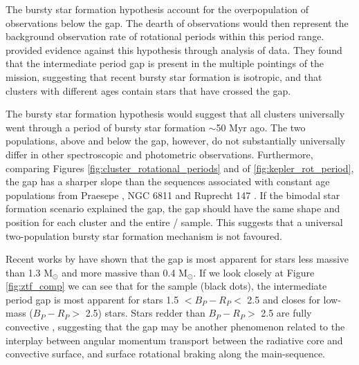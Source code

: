 The bursty star formation hypothesis  account for the overpopulation of observations below the gap. 
The dearth of observations would then represent the background observation rate of rotational periods within this period range.
\citet{gordon_stellar_2021} provided evidence against this hypothesis through analysis of \ktoo{} data.
They found that the intermediate period gap is present in the multiple pointings of the \ktoo{} mission, suggesting that recent bursty star formation is isotropic, and that clusters with different ages contain stars that have crossed the gap.

The bursty star formation hypothesis would suggest that all clusters universally went through a period of bursty star formation $\sim$50 Myr ago. 
The two populations, above and below the gap, however, do not substantially universally differ in other spectroscopic and photometric observations.
Furthermore, comparing Figures \ref{fig:cluster_rotational_periods} and of \ref{fig:kepler_rot_period}, the gap has a sharper slope than the sequences associated with constant age populations from Praesepe \citep{douglas_poking_2017,douglas_k2_2019}, NGC 6811 \citep{curtis_temporary_2019} and Ruprecht 147 \citep{curtis_when_2020}. 
If the bimodal star formation scenario explained the gap, the gap should have the same shape and position for each cluster and the entire \ktoo/\kepler{} sample.
This suggests that a universal two-population bursty star formation mechanism is not favoured.

Recent works by \citet{lu_bridging_2022} have shown that the gap is most apparent for stars less massive than 1.3 M$_{\odot}$ and more massive than 0.4 M$_{\odot}$.
If we look closely at Figure \ref{fig:ztf_comp} we can see that for the \ZTF{} sample (black dots), the intermediate period gap is most apparent for stars 1.5 $<B_P-R_P <$ 2.5 and closes for low-mass ($B_P-R_P >$ 2.5) stars.
Stars redder than $B_P-R_P >$ 2.5 are fully convective \citep{amard_first_2019}, suggesting that the gap may be another phenomenon related to the interplay between angular momentum transport between the radiative core and convective surface, and surface rotational braking along the main-sequence.

